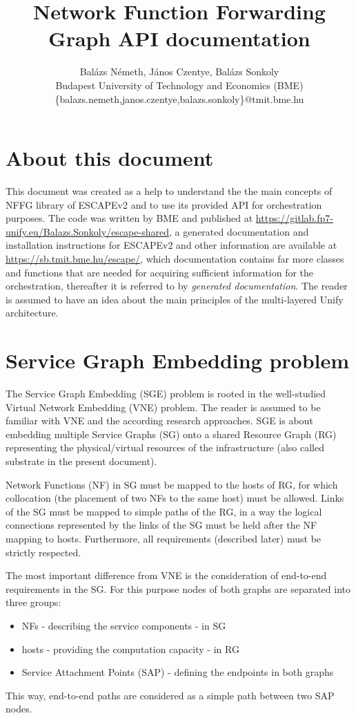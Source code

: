 \documentclass[a4paper,10pt]{scrartcl}
\title{Network Function Forwarding Graph API documentation}
\author{Bal\'azs N\'emeth, J\'anos Czentye, Bal\'azs Sonkoly\\
  Budapest University of Technology and Economics (BME)\\
  \{balazs.nemeth,janos.czentye,balazs.sonkoly\}@tmit.bme.hu}
\begin{document}
\maketitle

\section*{About this document}

This document was created as a help to understand the the main concepts of NFFG library of ESCAPEv2 and 
to use its provided API for orchestration purposes.
The code was written by BME and published at \url{https://gitlab.fp7-unify.eu/Balazs.Sonkoly/escape-shared}, 
a generated documentation and installation instructions for ESCAPEv2 and other information are available at
 \url{https://sb.tmit.bme.hu/escape/}, 
 which documentation contains far more classes and functions that are needed for 
 acquiring sufficient information for the orchestration, thereafter it is referred to by \emph{generated documentation}.
 The reader is assumed to have an idea about the main principles of the multi-layered Unify architecture.

\section{Service Graph Embedding problem}

The Service Graph Embedding (SGE) problem is rooted in the well-studied Virtual Network Embedding (VNE) problem.
The reader is assumed to be familiar with VNE and the according research approaches. 
SGE is about embedding multiple Service Graphs (SG) onto a shared Resource Graph (RG) 
representing the physical/virtual resources of the infrastructure (also called substrate in the present document).

Network Functions (NF) in SG must be mapped to the hosts of RG, for which collocation 
(the placement of two NFs to the same host) must be allowed. 
Links of the SG must be mapped to simple paths of the RG, in a way the logical connections represented 
by the links of the SG must be held after the NF mapping to hosts.
Furthermore, all requirements (described later) must be strictly respected.

The most important difference from VNE is the consideration of end-to-end requirements in the SG.
For this purpose nodes of both graphs are separated into three groups:
\begin{itemize}
\item NFs - describing the service components - in SG
\item hosts - providing the computation capacity - in RG
\item Service Attachment Points (SAP) - defining the endpoints in both graphs
\end{itemize}
This way, end-to-end paths are considered as a simple path between two SAP nodes. 
\end{document}
